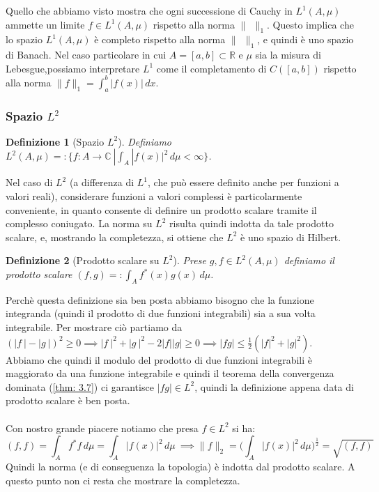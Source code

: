 \documentclass[a4paper,12pt]{report}
\newtheorem{definizione}{Definizione}[chapter]
\newcommand{\lt}{<}
\begin{document}
Quello che abbiamo visto mostra che ogni successione di Cauchy in $L^1(A,\mu)$ ammette un limite $f\in L^1(A,\mu)$ rispetto alla norma $\|\  \ \|_1$. 
Questo implica che lo spazio $L^1(A,\mu)$ è completo rispetto alla norma $\|\ \ \|_1$, e quindi è uno spazio di Banach.
Nel caso particolare in cui $A=[a,b]\subset\mathbb{R}$ e $\mu$ sia la misura di Lebesgue,possiamo interpretare $L^1$ come il completamento di $C([a,b])$ rispetto alla norma $\|f\|_1=\int_a^b |f(x)|\,dx$.

\subsubsection{\Large Spazio $L^2$}\label{sec: L^2}

\begin{definizione}[Spazio $L^2$]
    Definiamo $L^2(A,\mu)=:\bigg\{f:A\to \mathbb{C} \ |\displaystyle\int_A|f(x) |^2\,d\mu \lt \infty\bigg\}$.
\end{definizione}

Nel caso di $L^2$ (a differenza di $L^1$, che può essere definito anche per funzioni a valori reali), considerare funzioni a valori complessi è particolarmente conveniente, in quanto consente di definire un prodotto scalare tramite il complesso coniugato. La norma su $L^2$ risulta quindi indotta da tale prodotto scalare, e, mostrando la completezza, si ottiene che $L^2$ è uno spazio di Hilbert.

\begin{definizione}[Prodotto scalare su $L^2$]
    Prese $g,f \in L^2(A,\mu)$ definiamo il prodotto scalare $(f,g)=:\displaystyle\int_Af^*(x)g(x)\,d\mu$.
\end{definizione}

Perchè questa definizione sia ben posta abbiamo bisogno che la funzione integranda (quindi il prodotto di due funzioni integrabili) sia a sua volta integrabile. Per mostrare ciò partiamo da $(|f\ |-|g\ |)^2\geq 0\implies |f\ |^2+|g\ |^2-2|f||g|\geq 0 \implies |fg|\leq\displaystyle\frac{1}{2}(|f|^2+|g|^2)$.
\\ Abbiamo che quindi il modulo del prodotto di due funzioni integrabili è maggiorato da una funzione integrabile e quindi il teorema della convergenza dominata (\ref{thm: 3.7}) ci garantisce $|fg|\in L^2$, quindi la definizione appena data di prodotto scalare è ben posta.
\\
\\ Con nostro grande piacere notiamo che presa $f\in L^2$ si ha:
\[(f,f)=\displaystyle\int_Af^*f\,d\mu=\int_A|f(x)|^2\,d\mu\ 
\implies  \|f\|_2=\bigg(\int_A|f(x)|^2\,d\mu\bigg)^\frac{1}{2}=\sqrt{(f,f)}\] 
Quindi la norma (e di conseguenza la topologia) è indotta dal prodotto scalare. A questo punto non ci resta che mostrare la completezza.
\end{document}
